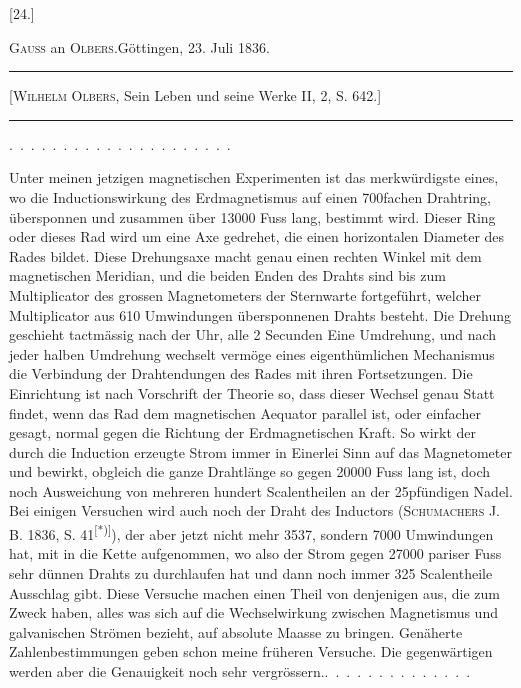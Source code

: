 \clearpage\begingroup{}
\begin{center}[24.]\end{center}
\begin{center}\textsc{Gauss} an \textsc{Olbers}.\quad Göttingen, 23. Juli 1836.\end{center}
\begin{center}\begin{minipage}{.88\linewidth}\centering\hrule\vspace{3pt}
\small [\textsc{Wilhelm Olbers}, Sein Leben und seine Werke II, 2, S. 642.]
\par\vspace{3pt}\hrule\end{minipage}\end{center}
\noindent .\ .\ .\ .\ .\ .\ .\ .\ .\ .\ .\ .\ .\ .\ .\ .\ .\ .\ .\ .\ .\par
\indent Unter meinen jetzigen magnetischen Experimenten ist das merkwürdigste
eines, wo die Inductionswirkung des Erdmagnetismus auf einen 700fachen
Drahtring, übersponnen und zusammen über 13000 Fuss lang, bestimmt wird.
Dieser Ring oder dieses Rad wird um eine Axe gedrehet, die einen horizontalen
Diameter des Rades bildet. Diese Drehungsaxe macht genau einen rechten
Winkel mit dem magnetischen Meridian, und die beiden Enden des Drahts
sind bis zum Multiplicator des grossen Magnetometers der Sternwarte fortgeführt,
welcher Multiplicator  aus 610 Umwindungen übersponnenen
Drahts besteht. Die Drehung geschieht tactmässig nach der Uhr, alle 2 Secunden
Eine Umdrehung, und nach jeder halben Umdrehung wechselt vermöge eines
eigenthümlichen Mechanismus die Verbindung der Drahtendungen des Rades mit
ihren Fortsetzungen. Die Einrichtung ist nach Vorschrift der Theorie so, dass
dieser Wechsel genau Statt findet, wenn das Rad dem magnetischen Aequator
parallel ist, oder einfacher gesagt, normal gegen die Richtung der Erdmagnetischen
Kraft. So wirkt der durch die Induction erzeugte Strom immer in
Einerlei Sinn auf das Magnetometer und bewirkt, obgleich die ganze Drahtlänge
so gegen 20000 Fuss lang ist, doch noch Ausweichung von mehreren
hundert Scalentheilen an der 25pfündigen Nadel. Bei einigen Versuchen
wird auch noch der Draht des Inductors (\textsc{Schumachers} J. B. 1836, S. 41\textsuperscript{[*)]}),
\begingroup\renewcommand{\thefootnote}{}\endgroup
\clearpage{}
\noindent der aber jetzt nicht mehr 3537, sondern 7000 Umwindungen hat, mit in die
Kette aufgenommen, wo also der Strom gegen 27000 pariser Fuss sehr dünnen
Drahts zu durchlaufen hat und dann noch immer 325 Scalentheile Ausschlag
gibt. Diese Versuche machen einen Theil von denjenigen aus, die zum
Zweck haben, alles was sich auf die Wechselwirkung zwischen Magnetismus
und galvanischen Strömen bezieht, auf absolute Maasse zu bringen. Genäherte
Zahlenbestimmungen geben schon meine früheren Versuche. Die gegenwärtigen
werden aber die Genauigkeit noch sehr vergrössern.\quad .\ .\ .\ .\ .\ .\ .\ .\ .\ .\ .\ .\ .\ .

